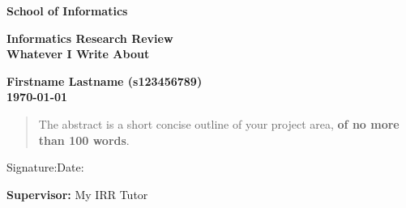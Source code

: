 \documentclass[a4paper,11pt]{article}
\newcommand{\name}{Firstname Lastname (s123456789)}
\newcommand{\field}{Whatever I Write About}
\newcommand{\supervisor}{My IRR Tutor}
\begin{document}
\begin{minipage}[b]{110mm}
        {\Huge\bf School of Informatics
        \vspace*{17mm}}
\end{minipage}
\hfill
\begin{minipage}[t]{40mm}               
\end{minipage}
\par\noindent
\vspace*{2cm}
\begin{center}
        \Large\bf Informatics Research Review \\
        \Large\bf \field
\end{center}
\vspace*{1.5cm}
\begin{center}
        \bf \name\\
        \monthyeardate\today
\end{center}
\vspace*{5mm}

%
%                       
\begin{abstract}
        The abstract is a short concise outline of your 
        project area, {\bf of no more than 100 words}.
\end{abstract}

\vspace*{1cm}

\vspace*{3cm}
Signature:\hspace*{8cm}Date:

\vfill
{\bf Supervisor:} \supervisor
\newpage

\setcounter{page}{1}                            %
\footruleheight{1pt}
\headruleheight{1pt}
\rhead{- \thepage}
\cfoot{}
%
\tableofcontents                                %
\end{document}

